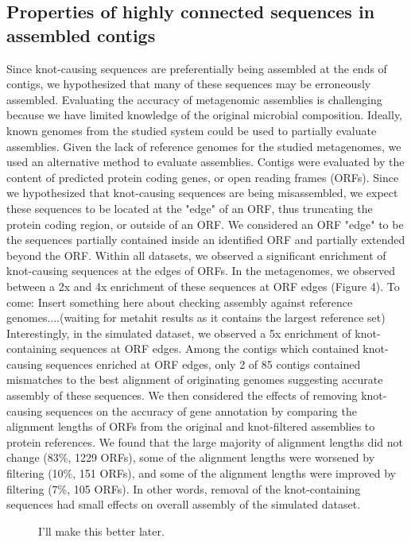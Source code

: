 \documentclass[11pt]{article} %
\begin{document}
\subsection{Properties of highly connected sequences in assembled contigs}
Since knot-causing sequences are preferentially being assembled at the ends of contigs, we hypothesized that many of these sequences may be erroneously assembled.   Evaluating the accuracy of metagenomic assemblies is challenging because we have limited knowledge of the original microbial composition.  Ideally, known genomes from the studied system could be used to partially evaluate assemblies.  Given the lack of reference genomes for the studied metagenomes, we used an alternative method to evaluate assemblies.  Contigs were evaluated by the content of predicted protein coding genes, or open reading frames (ORFs).  Since we hypothesized that knot-causing sequences are being misassembled, we expect these sequences to be located at the "edge" of an ORF, thus truncating the protein coding region, or outside of an ORF.  We considered an ORF "edge" to be the sequences partially contained inside an identified ORF and partially extended beyond the ORF.    
	Within all datasets, we observed a significant enrichment of knot-causing sequences at the edges of ORFs. In the metagenomes, we observed between a 2x and 4x enrichment of these sequences at ORF edges (Figure 4).  To come:  Insert something here about checking assembly against reference genomes....(waiting for metahit results as it contains the largest reference set) 
	Interestingly, in the simulated dataset, we observed a 5x enrichment of knot-containing sequences at ORF edges.  Among the contigs which contained knot-causing sequences enriched at ORF edges, only 2 of 85 contigs contained mismatches to the best alignment of originating genomes suggesting accurate assembly of these sequences.  We then considered the effects of removing knot-causing sequences on the accuracy of gene annotation by comparing the alignment lengths of ORFs from the original and knot-filtered assemblies to protein references.  We found that the large majority of alignment lengths did not change (83\%, 1229 ORFs), some of the alignment lengths were worsened by filtering (10\%, 151 ORFs), and some of the alignment lengths were improved by filtering (7\%, 105 ORFs).  In other words, removal of the knot-containing sequences had small effects on overall assembly of the simulated dataset.  
	
	
	

\begin{figure}
\caption{I'll make this better later.}
\end{figure}
\end{document}
